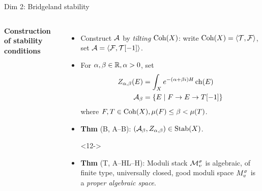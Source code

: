 \documentclass[8pt]{beamer} %
\begin{document}
\begin{frame}{Dim 2: Bridgeland stability}
\begin{columns}[t]
        \textbf{Construction of stability conditions}
        \begin{itemize}
            \item<10-> Construct $\mathcal{A}$ by \textit{tilting} $\mathrm{Coh}(X)$: %
            write $\mathrm{Coh}(X) = \langle \mathcal{T}, \mathcal{F} \rangle$, set $\mathcal{A} = \langle \mathcal{F}, \mathcal{T}[-1] \rangle$.
            \item<11-> For $\alpha, \beta \in \mathbb{R}, \alpha > 0$, set
            \begin{align*}
                Z_{\alpha, \beta}(E) & = \int_X e^{-(\alpha + \beta i)H}\operatorname{\mathrm{ch}}(E) \\
                \mathcal{A}_\beta & = \{ E \;|\; F \to E \to T[-1] \}
            \end{align*}
            where $F, T \in \mathrm{Coh}(X), \mu(F) \le \beta < \mu(T)$. %
            \item<11-> \textbf{Thm} (B, A--B): $(\mathcal{A}_\beta, Z_{\alpha,\beta}) \in \operatorname{\mathrm{Stab}}(X)$.
            \item[]<12->
            \begin{center}
        \end{center}
            \item<13-> \textbf{Thm} (T, A--HL--H): Moduli stack $\mathcal{M}^\sigma_v$ is algebraic, of finite type, universally closed, good moduli space $M^\sigma_v$ is a \textit{proper algebraic space}.
        \end{itemize}
    \end{columns}
\end{frame}
\end{document}
